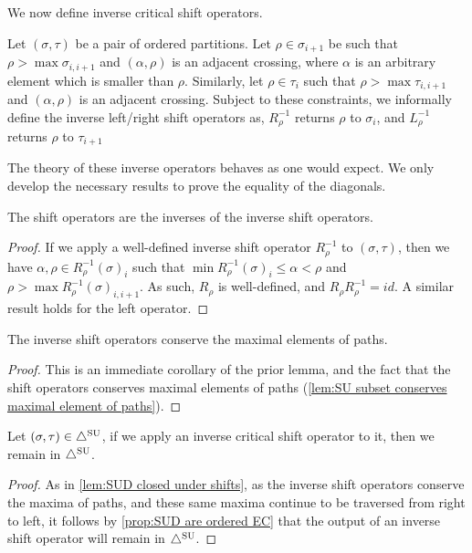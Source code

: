 We now define inverse critical shift operators.
\begin{definition} \label{def:critical SU inverse shift}
Let $(\sigma,\tau)$ be a pair of ordered partitions. Let $\rho \in \sigma_{i+1}$ be such that $\rho>\max \sigma_{i,i+1}$ and $(\alpha,\rho)$ is an adjacent crossing, where $\alpha$ is an arbitrary element which is smaller than $\rho$. 
Similarly, let $\rho \in \tau_{i} $ such that $\rho > \max \tau_{i,i+1}$ and $(\alpha,\rho)$ is an adjacent crossing.
Subject to these constraints, we informally define the inverse left/right shift operators as, $R^{-1}_\rho$ returns $\rho$ to $\sigma_i$, and $L^{-1}_\rho$ returns $\rho$ to $\tau_{i+1}$
\end{definition}
The theory of these inverse operators behaves as one would expect. We only develop the necessary results to prove the equality of the diagonals. 
\begin{lemma} \label{lem: shift operators are inverse to their inverses}
The shift operators are the inverses of the inverse shift operators.
\end{lemma}
\begin{proof}
If we apply a well-defined inverse shift operator $R^{-1}_{\rho}$ to $(\sigma,\tau)$, then we have $\alpha,\rho \in R^{-1}_{\rho}(\sigma)_{i}$ such that $\min R^{-1}_{\rho}(\sigma)_i \leq \alpha<\rho$ and $\rho >\max R^{-1}_{\rho}(\sigma)_{i,i+1}$. As such, $R_{\rho}$ is well-defined, and $R_{\rho} R^{-1}_{\rho}=id$. A similar result holds for the left operator.
\end{proof}

\begin{lemma}
The inverse shift operators conserve the maximal elements of paths.
\end{lemma}
\begin{proof}
This is an immediate corollary of the prior lemma, and the fact that the shift operators conserves maximal elements of paths (\cref{lem:SU subset conserves maximal element of paths}).
\end{proof}

\begin{lemma} \label{lem:SUD closed under inverse shifts}
Let $(\sigma,\tau)\in \triangle^{\mathrm{SU}}$, if we apply an inverse critical shift operator to it, then we remain in $\triangle^{\mathrm{SU}}$.
\end{lemma}
\begin{proof}
As in \cref{lem:SUD closed under shifts}, as the inverse shift operators conserve the maxima of paths, and these same maxima continue to be traversed from right to left, it follows by \cref{prop:SUD are ordered EC} that the output of an inverse shift operator will remain in $\triangle^{\mathrm{SU}}$.
\end{proof}

